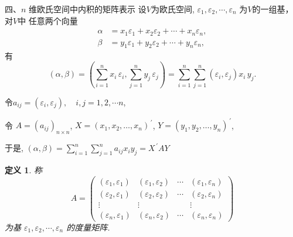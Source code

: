 \documentclass[13pt]{beamer}
\newtheorem*{defi}{定义}
\begin{document}
\begin{frame}
{四、$n$ 维欧氏空间中内积的矩阵表示}
设$V$为欧氏空间, $\varepsilon_{1}, \varepsilon_{2}, \cdots, \varepsilon_{n}$ 为$V$的一组基，对$V$中
任意两个向量
\begin{align*}
\alpha & = x_{1} \varepsilon_{1}+x_{2} \varepsilon_{2}+\cdots+x_{n} \varepsilon_{n},\\
\beta  & = y_{1} \varepsilon_{1}+y_{2} \varepsilon_{2}+\cdots+y_{n} \varepsilon_{n},
\end{align*}
有
$$
(\alpha, \beta)
=\left(\sum_{i=1}^{n} x_{i} \, \varepsilon_{i}, \sum_{j=1}^{n} y_{j} \, \varepsilon_{j}\right)
=\sum_{i=1}^{n} \sum_{j=1}^{n}\left(\varepsilon_{i}, \varepsilon_{j}\right) x_{i}\, y_{j}.$$
\end{frame}


\begin{frame}

令$ a_{i j}=\left(\varepsilon_{i}, \varepsilon_{j}\right), \quad i, j=1,2, \cdots n$, 

令
$A=\left(a_{i j} \right)_{n \times n}$,
$X= \left(x_1, x_2, \dots, x_n \right)^{\, \prime}$, 
$Y=\left(y_1, y_2, \dots, y_n \right)^{\, \prime}$,

于是,
$(\alpha, \beta)=\sum_{i=1}^{n} \sum_{j=1}^{n} a_{i j} x_{i} y_{j}=X^{\, \prime} A Y$

\begin{defi}
称$$A=
\left(\begin{array}{cccc}
\left(\varepsilon_{1}, \varepsilon_{1}\right) & \left(\varepsilon_{1}, \varepsilon_{2}\right) & \cdots & \left(\varepsilon_{1}, \varepsilon_{n}\right) \\ 
\left(\varepsilon_{2}, \varepsilon_{1}\right) & \left(\varepsilon_{2}, \varepsilon_{2}\right) & \cdots & \left(\varepsilon_{2}, \varepsilon_{n}\right) \\
\vdots & \vdots &  & \vdots \\ 
\left(\varepsilon_{n}, \varepsilon_{1}\right)  & \left(\varepsilon_{n}, \varepsilon_{2}\right) & \cdots & \left(\varepsilon_{n}, \varepsilon_{n}\right)
\end{array}\right)$$
为基 $\varepsilon_{1}, \varepsilon_{2}, \cdots, \varepsilon_{n}$ 的度量矩阵.
\end{defi}


\end{frame}
\end{document}
